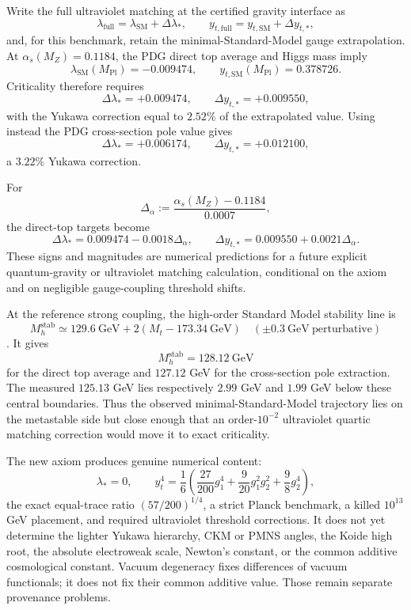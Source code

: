 \begin{theorem}
\label{thm:cba-threshold-target}
Write the full ultraviolet matching at the certified gravity interface as
\[
 \lambda_{\mathrm{full}}
 =\lambda_{\mathrm{SM}}+\Delta\lambda_*,
 \qquad
 y_{t,\mathrm{full}}
 =y_{t,\mathrm{SM}}+\Delta y_{t,*},
\]
and, for this benchmark, retain the minimal-Standard-Model gauge extrapolation.
At $\alpha_s(M_Z)=0.1184$, the PDG direct top average and Higgs mass imply
\[
 \lambda_{\mathrm{SM}}(M_{\mathrm{Pl}})=-0.009474,
 \qquad
 y_{t,\mathrm{SM}}(M_{\mathrm{Pl}})=0.378726.
\]
Criticality therefore requires
\[
 \boxed{
 \Delta\lambda_*=+0.009474,
 \qquad
 \Delta y_{t,*}=+0.009550,}
\]
with the Yukawa correction equal to $2.52\%$ of the extrapolated value.
Using instead the PDG cross-section pole value gives
\[
 \boxed{
 \Delta\lambda_*=+0.006174,
 \qquad
 \Delta y_{t,*}=+0.012100,}
\]
a $3.22\%$ Yukawa correction.

For
\[
 \Delta_\alpha
 :=\frac{\alpha_s(M_Z)-0.1184}{0.0007},
\]
the direct-top targets become
\[
 \Delta\lambda_*
 =0.009474-0.0018\Delta_\alpha,
 \qquad
 \Delta y_{t,*}
 =0.009550+0.0021\Delta_\alpha.
\]
These signs and magnitudes are numerical predictions for a future explicit
quantum-gravity or ultraviolet matching calculation, conditional on the axiom and
on negligible gauge-coupling threshold shifts.
\end{theorem}

\begin{corollary}
At the reference strong coupling, the high-order Standard Model stability line is
\[
 M_h^{\mathrm{stab}}
 \simeq129.6\ \mathrm{GeV}+2(M_t-173.34\ \mathrm{GeV})
 \quad(\pm0.3\ \mathrm{GeV\ perturbative})
\]
\cite{buttazzo-criticality}.  It gives
\[
 M_h^{\mathrm{stab}}=128.12\ \mathrm{GeV}
\]
for the direct top average and $127.12$ GeV for the cross-section pole extraction.
The measured $125.13$ GeV lies respectively $2.99$ GeV and $1.99$ GeV below these
central boundaries.  Thus the observed minimal-Standard-Model trajectory lies on
the metastable side but close enough that an order-$10^{-2}$ ultraviolet quartic
matching correction would move it to exact criticality.
\end{corollary}

\begin{remark}
The new axiom produces genuine numerical content:
\[
 \lambda_*=0,
 \qquad
 y_t^4=\frac16\left(
 \frac{27}{200}g_1^4+\frac9{20}g_1^2g_2^2+\frac98g_2^4\right),
\]
the exact equal-trace ratio $(57/200)^{1/4}$, a strict Planck benchmark, a killed
$10^{13}$ GeV placement, and required ultraviolet threshold corrections.
It does not yet determine the lighter Yukawa hierarchy, CKM or PMNS angles, the
Koide high root, the absolute electroweak scale, Newton's constant, or the common
additive cosmological constant.  Vacuum degeneracy fixes differences of vacuum
functionals; it does not fix their common additive value.  Those remain separate
provenance problems.
\end{remark}

